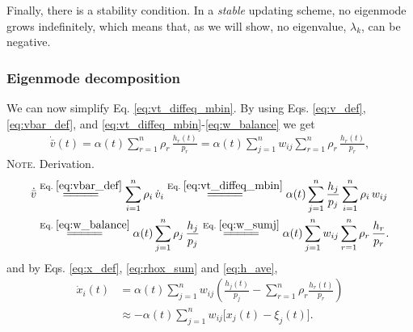 \documentclass[reprint, superscriptaddress, floatfix]{revtex4-1}
\newcommand{\note}[1]{{\color{DarkGreen}\footnotesize \textsc{Note.} #1}}
\begin{document}
Finally, there is a stability condition.
%
In a \emph{stable} updating scheme,
no eigenmode grows indefinitely,
which means that, as we will show, no eigenvalue, $\lambda_k$,
can be negative.




\subsubsection{Eigenmode decomposition}



We can now simplify Eq. \eqref{eq:vt_diffeq_mbin}.
%
By using Eqs.
\eqref{eq:v_def}, \eqref{eq:vbar_def}, and
\eqref{eq:vt_diffeq_mbin}-\eqref{eq:w_balance}
we get
%
\begin{align*}
  \dot{ \bar v }(t)
  =
  \alpha(t)
  \sum_{r = 1}^n \rho_r
    \, \frac{ h_r(t) } { p_r }
  =
  \alpha(t)
  \sum_{j = 1}^n w_{ij}
  \sum_{r = 1}^n \rho_r
    \, \frac{ h_r(t) } { p_r }
  ,
\end{align*}
%
\note{Derivation.
$$\begin{aligned}
  \dot{ \bar v }
  &
  \stackrel{\mathrm{Eq.\; \eqref{eq:vbar_def}}}
  {=\joinrel=\joinrel=\joinrel=\joinrel=}
  \sum_{i = 1}^n \rho_i \, \dot v_i
  \stackrel{\mathrm{Eq.\; \eqref{eq:vt_diffeq_mbin}}}
  {=\joinrel=\joinrel=\joinrel=\joinrel=}
  \alpha(t)
  \sum_{j = 1}^n \frac{ h_j } { p_j }
                 \sum_{ i = 1 }^{n} \rho_i \, w_{ij}
  \\
  &
  \stackrel{\mathrm{Eq.\; \eqref{eq:w_balance}}}
  {=\joinrel=\joinrel=\joinrel=\joinrel=}
  \alpha(t)
  \sum_{j = 1}^n \rho_j
    \, \frac{ h_j } { p_j }
  \stackrel{\mathrm{Eq.\; \eqref{eq:w_sumj}}}
  {=\joinrel=\joinrel=\joinrel=\joinrel=}
  \alpha(t)
  \sum_{j = 1}^n w_{ij}
  \sum_{r = 1}^n \rho_r
    \, \frac{ h_r } { p_r }
  .
\end{aligned}$$
}
%
and by Eqs. \eqref{eq:x_def}, \eqref{eq:rhox_sum} and \eqref{eq:h_ave},
%
$$
\begin{aligned}
  \dot x_i(t)
  &= \alpha(t) \sum_{j=1}^n w_{ij}
  \left(
    \frac{ h_j(t) } { p_j }
    -
    \sum_{r = 1}^n
      \rho_r \frac{ h_r(t) } { p_r }
  \right)
  \\
  &\approx
  -\alpha(t) \sum_{j = 1}^n
  w_{ij} \bigl[ x_j(t) - \xi_j (t) \bigr]
  .
\end{aligned}
$$
\end{document}
